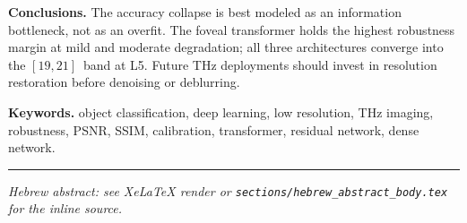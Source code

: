 \noindent\textbf{Conclusions.}\quad
The accuracy collapse is best modeled as an information bottleneck, not
as an overfit. The foveal transformer holds the highest robustness
margin at mild and moderate degradation; all three architectures
converge into the $[19, 21]\,$\Mpp{} band at L5. Future THz deployments
should invest in resolution restoration before denoising or deblurring.

\noindent\textbf{Keywords.}\quad
object classification, deep learning, low resolution, THz imaging,
robustness, PSNR, SSIM, calibration, transformer, residual network,
dense network.

\bigskip
\hrule
\bigskip

\ifdefined\XeTeXversion
  \begin{hebrew}
  
  \end{hebrew}
\else
  \noindent\emph{\small Hebrew abstract: see XeLaTeX render or
  \texttt{sections/hebrew\_abstract\_body.tex} for the inline source.}
\fi
